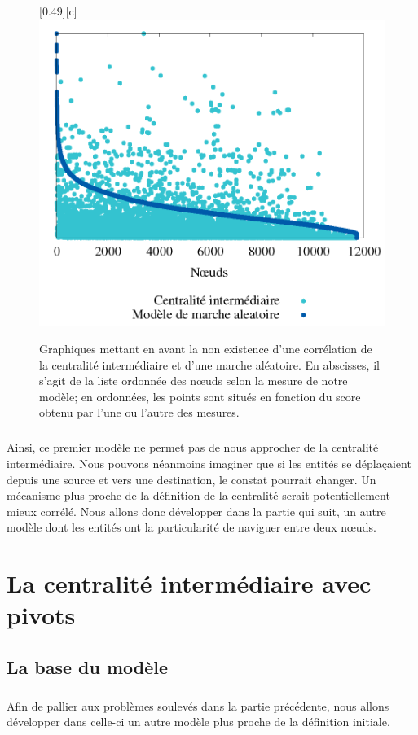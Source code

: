 \documentclass[a4paper, 10pt]{report}
\begin{document}
\begin{figure}[htbp]
{	}
	\hfill
	[0.49\linewidth][c]{
		\includegraphics[width=0.49\linewidth]{./img/marche_aleatoire_le_havre.png}
	}
	\caption{Graphiques mettant en avant la non existence d'une corrélation de la centralité intermédiaire et d'une marche aléatoire. En abscisses, il s'agit de la liste ordonnée des n\oe uds selon la mesure de notre modèle; en ordonnées, les points sont situés en fonction du score obtenu par l'une ou l'autre des mesures.}
	\label{fig:graphiques_random_walk}
\end{figure}

\paragraph{}Ainsi, ce premier modèle ne permet pas de nous approcher de la centralité intermédiaire. Nous pouvons néanmoins imaginer que si les entités se déplaçaient depuis une source et vers une destination, le constat pourrait changer. Un mécanisme plus proche de la définition de la centralité serait potentiellement mieux corrélé. Nous allons donc développer dans la partie qui suit, un autre modèle dont les entités ont la particularité de naviguer entre deux n\oe uds.

\chapter{La centralité intermédiaire avec pivots}

	\section{La base du modèle}
	
\paragraph{}Afin de pallier aux problèmes soulevés dans la partie précédente, nous allons développer dans celle-ci un autre modèle plus proche de la définition initiale.
\end{document}

